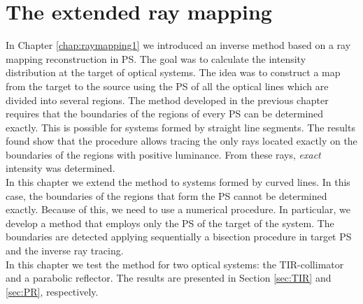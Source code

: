 \chapter{The extended ray mapping}
\label{chap:raymapping2}
In Chapter \ref{chap:raymapping1} we introduced an inverse method based on a ray mapping reconstruction in PS.
The goal was to calculate the intensity distribution at the target of optical systems. 
The idea was to construct a map from the target  to the source  using the PS of all the optical lines which are divided into several regions.  
The method developed in the previous chapter requires that the boundaries of the regions of every PS can be determined exactly. This is possible for systems formed by straight line segments.
The results found show that the procedure allows tracing the only rays located exactly on the boundaries of the regions with positive luminance. From these rays, \textit{exact} intensity was determined. \\ \indent
In this chapter we extend the method to systems formed by curved lines. In this case, the boundaries of the regions that form the PS cannot be determined exactly.
Because of this, we need to use a numerical procedure. In particular, we develop a method that employs only the PS of the target of the system. 
The boundaries are detected applying sequentially a bisection procedure in target PS and the inverse ray tracing.\\ \indent
In this chapter we test the method for two optical systems: the TIR-collimator and a parabolic reflector. The results are presented in Section \ref{sec:TIR} and \ref{sec:PR}, respectively.

